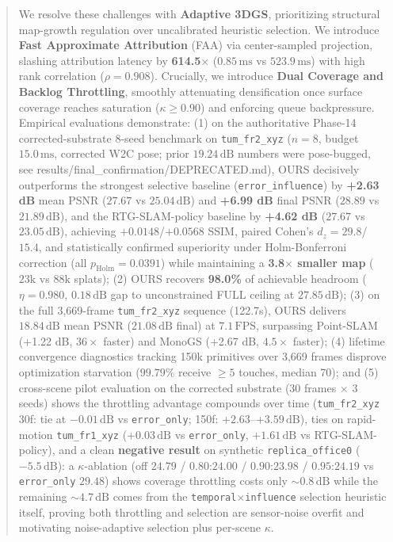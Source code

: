 \documentclass[10pt,twocolumn,letterpaper]{article}
\begin{document}
\begin{abstract}
We resolve these challenges with \textbf{Adaptive 3DGS}, prioritizing structural map-growth regulation over uncalibrated heuristic selection. We introduce \textbf{Fast Approximate Attribution} (FAA) via center-sampled projection, slashing attribution latency by \textbf{614.5$\times$} ($0.85\,\mathrm{ms}$ vs $523.9\,\mathrm{ms}$) with high rank correlation ($\rho = 0.908$). Crucially, we introduce \textbf{Dual Coverage and Backlog Throttling}, smoothly attenuating densification once surface coverage reaches saturation ($\kappa \ge 0.90$) and enforcing queue backpressure.
Empirical evaluations demonstrate:
(1) on the authoritative Phase-14 corrected-substrate 8-seed benchmark on \texttt{tum\_fr2\_xyz} ($n=8$, budget $15.0\,\mathrm{ms}$, corrected W2C pose; prior $19.24\,\mathrm{dB}$ numbers were pose-bugged, see results/final\_confirmation/DEPRECATED.md), OURS decisively outperforms the strongest selective baseline (\texttt{error\_influence}) by \textbf{+2.63 dB} mean PSNR ($27.67$ vs $25.04\,\mathrm{dB}$) and \textbf{+6.99 dB} final PSNR ($28.89$ vs $21.89\,\mathrm{dB}$), and the RTG-SLAM-policy baseline by \textbf{+4.62 dB} ($27.67$ vs $23.05\,\mathrm{dB}$), achieving $+0.0148$/$+0.0568$ SSIM, paired Cohen's $d_z = \mathbf{29.8}$/$\mathbf{15.4}$, and statistically confirmed superiority under Holm-Bonferroni correction (all $p_{\mathrm{Holm}} = 0.0391$) while maintaining a \textbf{3.8$\times$ smaller map} ($23\mathrm{k}$ vs $88\mathrm{k}$ splats);
(2) OURS recovers \textbf{98.0\%} of achievable headroom ($\eta = 0.980$, $0.18\,\mathrm{dB}$ gap to unconstrained FULL ceiling at $27.85\,\mathrm{dB}$);
(3) on the full 3,669-frame \texttt{tum\_fr2\_xyz} sequence (122.7s), OURS delivers $18.84\,\mathrm{dB}$ mean PSNR ($21.08\,\mathrm{dB}$ final) at $7.1\,\mathrm{FPS}$, surpassing Point-SLAM (+1.22 dB, $36\times$ faster) and MonoGS (+2.67 dB, $4.5\times$ faster);
(4) lifetime convergence diagnostics tracking 150k primitives over 3,669 frames disprove optimization starvation ($99.79\%$ receive $\ge 5$ touches, median 70); and
(5) cross-scene pilot evaluation on the corrected substrate (30 frames $\times$ 3 seeds) shows the throttling advantage compounds over time (\texttt{tum\_fr2\_xyz} 30f: tie at $-0.01\,\mathrm{dB}$ vs \texttt{error\_only}; 150f: $+2.63$--$+3.59\,\mathrm{dB}$), ties on rapid-motion \texttt{tum\_fr1\_xyz} ($+0.03\,\mathrm{dB}$ vs \texttt{error\_only}, $+1.61\,\mathrm{dB}$ vs RTG-SLAM-policy), and a clean \textbf{negative result} on synthetic \texttt{replica\_office0} ($-5.5\,\mathrm{dB}$): a $\kappa$-ablation (off $24.79$ / $0.80$:$24.00$ / $0.90$:$23.98$ / $0.95$:$24.19$ vs \texttt{error\_only} $29.48$) shows coverage throttling costs only $\sim 0.8\,\mathrm{dB}$ while the remaining $\sim 4.7\,\mathrm{dB}$ comes from the \texttt{temporal}$\times$\texttt{influence} selection heuristic itself, proving both throttling and selection are sensor-noise overfit and motivating noise-adaptive selection plus per-scene $\kappa$.
\end{abstract}
\end{document}

